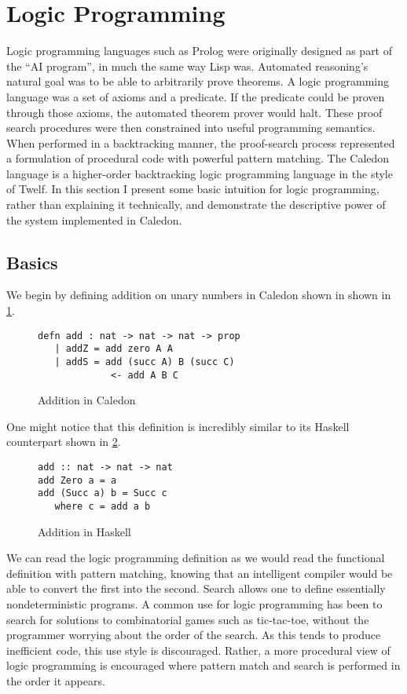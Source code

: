 \section{Logic Programming}

Logic programming languages such as Prolog were originally designed as part of the ``AI
program'', in much the same way Lisp was. Automated reasoning’s natural goal was
to be able to arbitrarily prove theorems. A logic programming language was a 
set of axioms and a predicate. If the predicate could be proven through those axioms,
the automated theorem prover would halt.  These proof search procedures were
then constrained into useful programming semantics. When performed in a backtracking
manner, the proof-search process represented a formulation of procedural code
with powerful pattern matching. The Caledon language is a higher-order backtracking
logic programming language in the style of Twelf. In this section I present some basic
intuition for logic programming, rather than explaining it technically, and demonstrate the 
descriptive power of the system implemented in Caledon.

\FloatBarrier
\subsection{Basics}
We begin by defining addition on unary numbers in Caledon shown in shown in \ref{code:add}.

\begin{figure}[H]
\begin{lstlisting}
defn add : nat -> nat -> nat -> prop
   | addZ = add zero A A
   | addS = add (succ A) B (succ C) 
             <- add A B C
\end{lstlisting}
\caption{Addition in Caledon}
\label{code:add}
\end{figure}

One might notice that this definition is incredibly similar to its Haskell counterpart shown in \ref{code:hask}.

\begin{figure}[H]
\begin{lstlisting}
add :: nat -> nat -> nat
add Zero a = a
add (Succ a) b = Succ c
   where c = add a b
\end{lstlisting}
\caption{Addition in Haskell}
\label{code:hask}
\end{figure}

We can read the logic programming definition as we would read the functional definition with pattern
matching, knowing that an intelligent compiler would be able to convert the first into the second.  
Search allows one to define essentially nondeterministic programs. A common use for
logic programming has been to search for solutions to combinatorial games such as tic-tac-toe, 
without the programmer worrying about the order of the search. As this tends
to produce inefficient code, this use style is discouraged. Rather, a more procedural view of logic programming is encouraged where pattern match and search is performed
in the order it appears.

